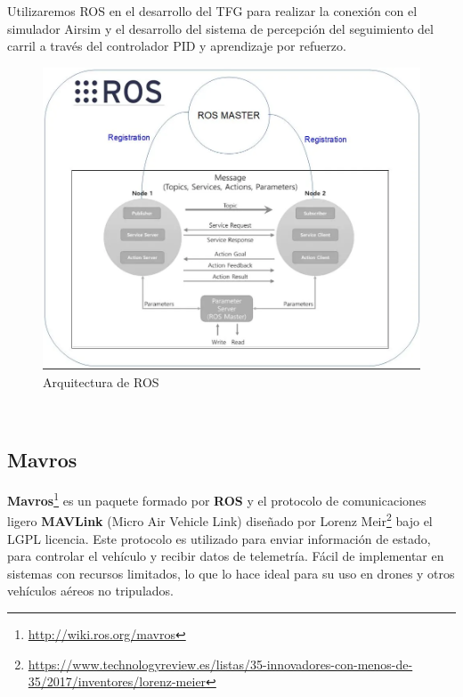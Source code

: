 Utilizaremos ROS en el desarrollo del TFG para realizar la conexión con el simulador Airsim y el desarrollo del sistema de percepción del seguimiento del carril a través del controlador PID y 
aprendizaje por refuerzo. \newline


\begin{figure} [H]
    \begin{center}
      \includegraphics[scale=0.4]{figs/Plataformas_Desarollo/arq_ros.png}
    \end{center}
    \caption{Arquitectura de ROS}
    \label{fig:ArqROS}
  \end{figure}\
\newpage
\subsection{Mavros}
\label{sec:mavros}

\textbf{Mavros}\footnote{\url{http://wiki.ros.org/mavros}} es un paquete formado por \textbf{ROS} y el protocolo de comunicaciones ligero \textbf{MAVLink} (Micro Air Vehicle Link) diseñado por Lorenz Meir\footnote{\url{https://www.technologyreview.es/listas/35-innovadores-con-menos-de-35/2017/inventores/lorenz-meier}} bajo el LGPL licencia. Este protocolo es utilizado para enviar información de estado,
para controlar el vehículo y recibir datos de telemetría. Fácil de implementar en sistemas con recursos limitados, 
lo que lo hace ideal para su uso en drones y otros vehículos aéreos no tripulados. \newline


